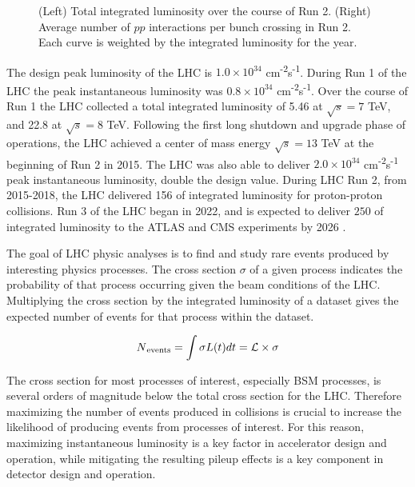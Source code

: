\begin{figure}
\begin{subfigure}[b]{0.48\textwidth}
     \end{subfigure}
     \hfill
     \caption { (Left) Total integrated luminosity over the course of Run 2. (Right) Average number of $pp$ interactions per bunch crossing in Run 2. Each curve is weighted by the integrated luminosity for the year.}
     \label{fig:lumi_run2}
\end{figure}
 
 The design peak luminosity of the LHC is $1.0 \times 10^{34}$ cm\textsuperscript{-2}s\textsuperscript{-1}. During Run 1 of the LHC the peak instantaneous luminosity was $0.8 \times 10^{34}$ cm\textsuperscript{-2}s\textsuperscript{-1}. Over the course of Run 1 the LHC collected a total integrated luminosity of 5.46 \invfb at $\sqrt{s} = 7$ TeV, and 22.8 \invfb at $\sqrt{s} = 8$ TeV. Following the first long shutdown and upgrade phase of operations, the LHC achieved a center of mass energy $\sqrt{s} = 13$ TeV at the beginning of Run 2 in 2015. The LHC was also able to deliver $2.0 \times 10^{34}$ cm\textsuperscript{-2}s\textsuperscript{-1} peak instantaneous luminosity, double the design value. During LHC Run 2, from 2015-2018, the LHC delivered 156 \invfb of integrated luminosity for proton-proton collisions. Run 3 of the LHC began in 2022, and is expected to deliver $250$ \invfb of integrated luminosity to the ATLAS and CMS experiments by 2026 \cite{lhc_timeline}.\par
 
The goal of LHC physic analyses is to find and study rare events produced by interesting physics processes. The cross section $\sigma$ of a given process indicates the probability of that process occurring given the beam conditions of the LHC. Multiplying the cross section by the integrated luminosity of a dataset gives the expected number of events for that process within the dataset.

 \begin{equation}
	N\textsubscript{events} = \int \sigma L(t) dt = \mathcal{L} \times \sigma
	\label{eq:xs}
\end{equation}

The cross section for most processes of interest, especially BSM processes, is several orders of magnitude below the total cross section for the LHC. Therefore maximizing the number of events produced in collisions is crucial to increase the likelihood of producing events from processes of interest. For this reason, maximizing instantaneous luminosity is a key factor in accelerator design and operation, while mitigating the resulting pileup effects is a key component in detector design and operation. \par 

